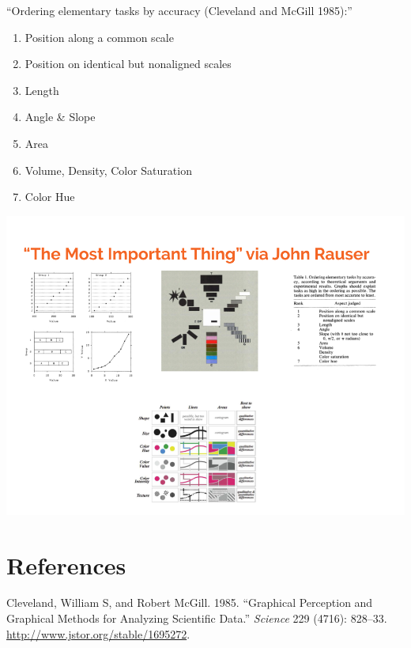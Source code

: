 \documentclass[
]{article}
\providecommand{\tightlist}{%
  \setlength{\itemsep}{0pt}\setlength{\parskip}{0pt}}
\begin{document}
``Ordering elementary tasks by accuracy (Cleveland and McGill 1985):''

\begin{enumerate}
\def\labelenumi{\arabic{enumi}.}
\tightlist
\item
  Position along a common scale
\item
  Position on identical but nonaligned scales
\item
  Length
\item
  Angle \& Slope
\item
  Area
\item
  Volume, Density, Color Saturation
\item
  Color Hue
\end{enumerate}

\includegraphics{Rauser-most-important-thing.png}

\hypertarget{references}{%
\section*{References}\label{references}}

\hypertarget{refs}{}
\leavevmode\hypertarget{ref-Cleveland1985}{}%
Cleveland, William S, and Robert McGill. 1985. ``Graphical Perception
and Graphical Methods for Analyzing Scientific Data.'' \emph{Science}
229 (4716): 828--33. \url{http://www.jstor.org/stable/1695272}.
\end{document}
